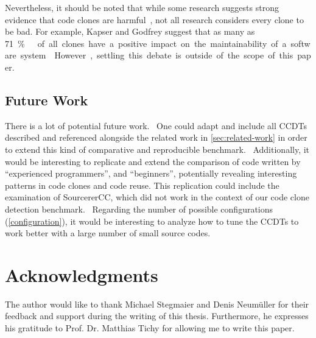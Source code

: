 \documentclass[10pt,journal,compsoc]{IEEEtran}
\begin{document}
Nevertheless, it should be noted that while some research suggests strong evidence that code clones are harmful~\cite{juergens2009code},
not all research considers every clone to be bad. For example, Kapser and Godfrey suggest that as many as \qty{71}\percent\ of all clones have a positive impact on the maintainability of a software system~\cite{kapser2008cloning}.
However, settling this debate is outside of the scope of this paper.

\subsection{Future Work}
There is a lot of potential future work.
\textbullet~One could adapt and include all CCDTs described and referenced alongside the related work in \cref{sec:related-work} in order to extend this kind of comparative and reproducible benchmark.
\textbullet~Additionally, it would be interesting to replicate and extend the comparison of code written by \enquote{experienced programmers}, and \enquote{beginners}, potentially revealing interesting patterns in code clones and code reuse.
This replication could include the examination of SourcererCC, which did not work in the context of our code clone detection benchmark.
\textbullet~Regarding the number of possible configurations (\cref{configuration}), it would be interesting to analyze how to tune the CCDTs to work better with a large number of small source codes.

\appendices



\section*{Acknowledgments}
The author would like to thank Michael Stegmaier and Denis Neumüller for their feedback and support during the writing of this thesis. Furthermore, he expresses his gratitude to Prof. Dr. Matthias Tichy for allowing me to write this paper.

\ifCLASSOPTIONcaptionsoff
  \newpage
\fi




\end{document}
